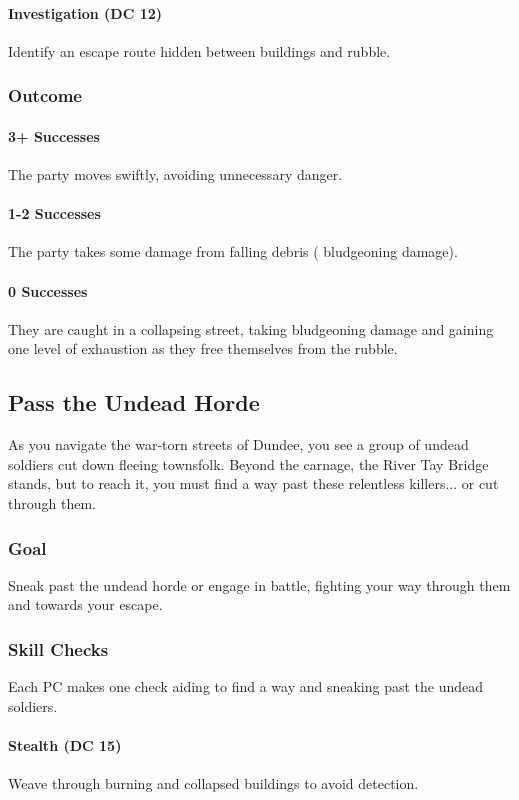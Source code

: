 \paragraph*{Investigation (DC 12)}
{\entryfont Identify an escape route hidden between buildings and rubble.}
\subsubsection*{Outcome}
\paragraph*{3+ Successes}
{\entryfont The party moves swiftly, avoiding unnecessary danger.}
\paragraph*{1-2 Successes}
{\entryfont The party takes some damage from falling debris ( bludgeoning damage).}
\paragraph*{0 Successes}
{\entryfont They are caught in a collapsing street, taking  bludgeoning damage and gaining one level of exhaustion as they free themselves from the rubble.}

\subsection*{Pass the Undead Horde}
\begin{DndReadAloud}
	As you navigate the war-torn streets of Dundee, you see a group of undead soldiers cut down fleeing townsfolk. Beyond the carnage, the River Tay Bridge stands, but to reach it, you must find a way past these relentless killers... or cut through them.
\end{DndReadAloud}
\subsubsection*{Goal}
{\entryfont Sneak past the undead horde or engage in battle, fighting your way through them and towards your escape.}
\subsubsection*{Skill Checks}
{\entryfont Each PC makes one check aiding to find a way and sneaking past the undead soldiers.}
\paragraph*{Stealth (DC 15)}
{\entryfont Weave through burning and collapsed buildings to avoid detection.}
